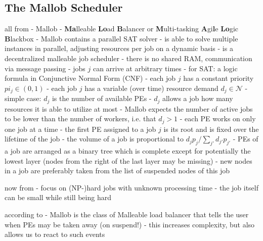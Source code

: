\subsection{The Mallob Scheduler}
\label{prelim: mallob}
all from \cite{schreiber2021scalable}
- Mallob - \textbf{Ma}lleable \textbf{Lo}ad \textbf{B}alancer or \textbf{M}ulti-tasking \textbf{A}gi\textbf{l}e \textbf{Lo}gic \textbf{B}lackbox
- Mallob contains a parallel SAT solver
- is able to solve multiple instances in parallel, adjusting resources per job on a dynamic basis
- is a decentralized malleable job scheduler
- there is no shared RAM, communication via message passing
- jobs $j$ can arrive at arbitrary times
	- for SAT: a logic formula in Conjunctive Normal Form (CNF)
	- each job $j$ has a constant priority $pi_j \in (0, 1)$
	- each job $j$ has a variable (over time) resource demand $d_j \in \mathcal{N}$
		- simple case: $d_j$ is the number of available PEs
	- $d_j$ allows a job how many resources it is able to utilize at most
	- Mallob expects the number of active jobs to be lower than the number of workers, i.e. that $d_j > 1$
		- each PE works on only one job at a time
	- the first PE assigned to a job $j$ is its root and is fixed over the lifetime of the job
	- the volume of a job is proportional to $d_j p_j / \sum_{j'} d_{j'} p_{j'}$
	- PEs of a job are arranged as a binary tree which is complete except for potentially the lowest layer (nodes from the right of the last layer may be missing)
	- new nodes in a job are preferably taken from the list of suspended nodes of this job
	
now from \cite{sanders2022decentralized}
- focus on (NP-)hard jobs with unknown processing time
- the job itself can be small while still being hard

according to \cite{feitelson1997job}
- Mallob is the class of Malleable load balancer that tells the user when PEs may be taken away (on suspend!)
- this increases complexity, but also allows us to react to such events

